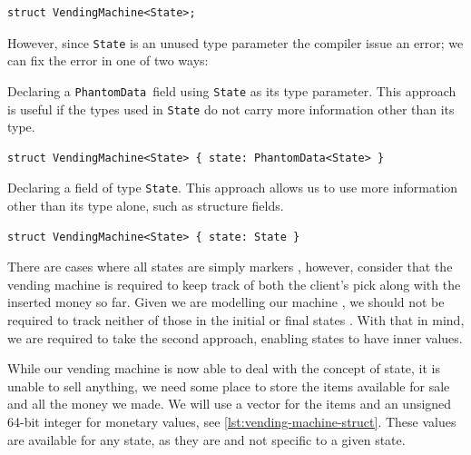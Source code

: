 \begin{verbatim}
struct VendingMachine<State>;
\end{verbatim}

However, since \texttt{State} is an unused type parameter the compiler issue an error;
we can fix the error in one of two ways:
\begin{compactitem}
    \item Declaring a \texttt{PhantomData}\footnotemark~field using \texttt{State} as its type parameter.
    This approach is useful if the types used in \texttt{State} do not carry more information other than its type.
    \begin{verbatim}
struct VendingMachine<State> { state: PhantomData<State> }
    \end{verbatim}
    \item Declaring a field of type \texttt{State}.
    This approach allows us to use more information other than its type alone, such as structure fields.
    \begin{verbatim}
struct VendingMachine<State> { state: State }
    \end{verbatim}
\end{compactitem}

There are cases where all states are simply markers ,
however, consider that the vending machine is required to keep track of both the client's pick along with the inserted money so far.
Given we are modelling our machine ,
we should not be required to track neither of those in the initial or final states .
With that in mind, we are required to take the second approach, enabling states to have inner values.

While our vending machine is now able to deal with the concept of state,
it is unable to sell anything, we need some place to store the items available for sale and all the money we made.
We will use a vector for the items and an unsigned 64-bit integer for monetary values, see \autoref{lst:vending-machine-struct}.
These values are available for any state, as they are  and not specific to a given state.


